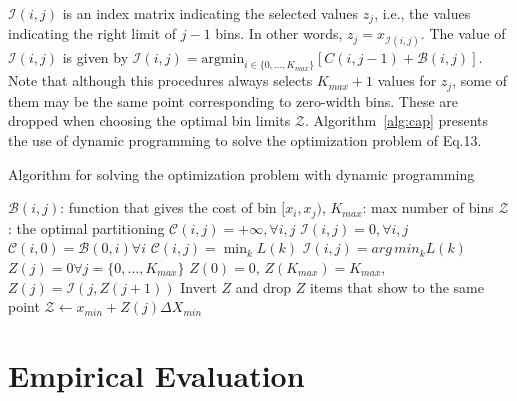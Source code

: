 \documentclass{article} %
\newcommand{\argmin}{arg\,min}
\begin{document}
\(\mathcal{I}(i,j)\) is an index matrix indicating the selected values
\(z_j\), i.e., the values indicating the right limit of \(j-1\)
bins. In other words, \(z_{j} = x_{\mathcal{I}(i,j)}\).
The value of \(\mathcal{I}(i,j)\) is given by
\( \mathcal{I}(i,j) = \mathrm{argmin}_{i \in \{0, \ldots, K_{max}\}}
\left [ C(i, j-1) + \mathcal{B}(i, j) \right ]\).
Note that although
this procedures always selects \(K_{max} + 1\) values for \(z_j\),
some of them may be the same point corresponding to zero-width
bins.
These are dropped when choosing the optimal bin limits
\(\mathcal{Z}\). Algorithm~\ref{alg:cap} presents the use of dynamic programming to solve the optimization
problem of Eq.13.

\begin{algorithm}
\caption{Algorithm for solving the optimization problem with dynamic programming }\label{alg:cap}
\begin{algorithmic}
\Require $\mathcal{B}(i,j)$: function that gives the cost of bin \([x_i, x_j)\), \(K_{max}\): max number of bins
\Ensure $\mathcal{Z}$: the optimal partitioning
\State $\mathcal{C}(i, j)  = + \infty, \forall i,j $ 
\State $\mathcal{I}(i, j)  = 0, \forall i,j $ 
\State $\mathcal{C}(i,0)  = \mathcal{B}(0, i) \forall i$ 
        \EndFor
        \State \(\mathcal{C}(i,j) = \min_k L(k) \)
        \State \(\mathcal{I}(i,j) = \argmin_k L(k) \)
    \EndFor
\EndFor
\State \(Z(j) = 0 \forall j = \{0, \ldots, K_{max}\}\) 
\State \(Z(0) = 0\), \(Z(K_{max}) = K_{max}\),   
    \State \(Z(j) = \mathcal{I}(j, Z(j+1)) \) 
\EndFor
\State Invert \(Z\) and drop \(Z\) items that show to the same point
\State \(\mathcal{Z} \leftarrow {x_{min}} + Z(j) \Delta X_{min} \) 
\end{algorithmic}
\end{algorithm}

\section{Empirical Evaluation}
\end{document}
